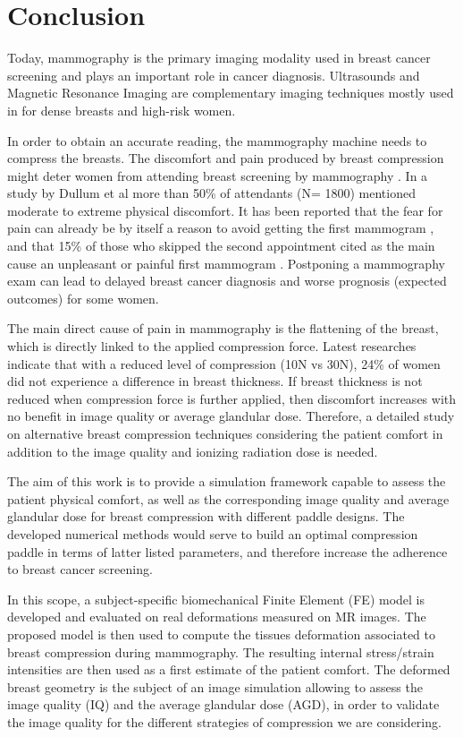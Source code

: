 \section{Conclusion}\label{section:conlusion}
Today, mammography is the primary imaging modality used in breast cancer screening and plays an important role in cancer diagnosis. Ultrasounds and Magnetic Resonance Imaging are complementary imaging techniques mostly used in for dense breasts and high-risk women.
 
In order to obtain an accurate reading, the mammography machine needs to compress the breasts.  The discomfort and pain produced by breast compression might deter women from attending breast screening by mammography  \citep{aro_psychosocial_1999,fleming_intermittent_2013}. In a study by Dullum et al \citep{dullum_rates_2000} more than 50\% of attendants (N= 1800) mentioned moderate to extreme physical discomfort.  It has been reported that the
fear for pain can already be by itself a reason to avoid getting the first mammogram \citep{andrews_pain_2001}, and that 15\% of those who skipped the second appointment cited as the main cause an unpleasant or painful first mammogram \citep{fleming_intermittent_2013,whelehan_effect_2013}.  Postponing a mammography exam can lead to delayed breast cancer diagnosis and worse prognosis (expected outcomes) for some women.

The main direct cause of pain in mammography is the flattening of the breast, which is directly linked to the applied compression force. Latest researches indicate that with a reduced level of compression (10N vs 30N), 24\% of women did not experience a difference in breast thickness. If breast thickness is not reduced when compression force is further applied, then discomfort increases with no benefit in image quality or average glandular dose. Therefore, a detailed study on alternative breast compression techniques considering the patient comfort in addition to the image quality and ionizing radiation dose is needed.

The aim of this work is to provide a simulation framework capable to assess the patient physical comfort, as well as the corresponding image quality and average glandular dose for breast compression with different paddle designs. The developed numerical methods would serve to build an optimal compression paddle in terms of latter listed parameters, and therefore increase the adherence to breast cancer screening. 

In this scope, a subject-specific biomechanical Finite Element (FE) model is developed and evaluated on real deformations measured on MR images. The proposed model is then used to compute the tissues deformation associated to breast compression during mammography.  The resulting internal stress/strain intensities are then used as a first estimate of the patient comfort. The deformed breast geometry is the subject of an image simulation allowing to assess the image quality (IQ) and the average glandular dose (AGD), in order to validate the image quality for the different strategies of compression we are considering.




